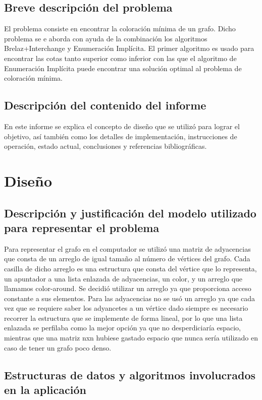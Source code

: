 \documentclass[a4paper,10pt]{article}
\begin{document}
\subsection{Breve descripción del problema}
El problema consiste en encontrar la coloración mínima de un grafo. Dicho problema se e aborda con ayuda de la combinación los algoritmos 
Brelaz+Interchange y Enumeración Implícita. El primer algoritmo es 
usado para encontrar las cotas tanto superior como inferior con las que 
el algoritmo de Enumeración Implícita puede encontrar una solución optimal
al problema de coloración mínima. 

\subsection{Descripción del contenido del informe}
En este informe se explica el concepto de diseño que se utilizó
para lograr el objetivo, así también como los detalles de implementación, 
instrucciones de operación, estado actual, conclusiones y referencias bibliográficas.

\section{Diseño}

\subsection{Descripción y justificación del modelo utilizado para representar el problema}
Para representar el grafo en el computador se utilizó una matriz de adyacencias que consta 
de un arreglo de igual tamaño al número de vértices del grafo. Cada casilla de dicho arreglo es 
una estructura que consta del vértice que lo representa, un apuntador a una lista enlazada de adyacencias, 
un color, y un arreglo que llamamos color-around. Se decidió utilizar un arreglo ya que proporciona acceso 
constante a sus elementos. Para las adyacencias no se usó un arreglo ya que cada vez que se requiere saber los 
adyancetes a un vértice dado siempre es necesario recorrer la estructura que se implemente de forma lineal, por lo que 
una lista enlazada se perfilaba como la mejor opción ya que no desperdiciaría espacio, mientras que una matriz nxn 
hubiese gastado espacio que nunca sería utilizado en caso de tener un grafo poco denso. 

\subsection{Estructuras de datos y algoritmos involucrados en la aplicación}
\end{document}
